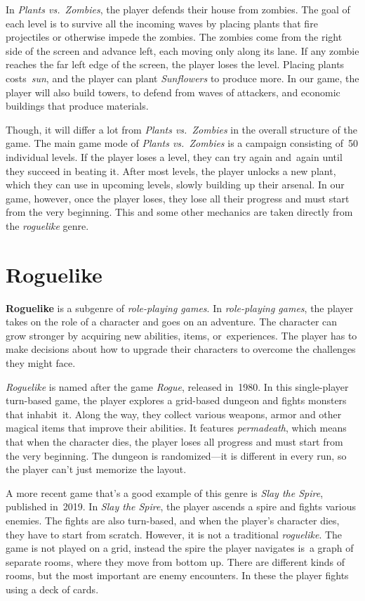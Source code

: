In \emph{Plants vs.\ Zombies}, the player defends their house from zombies.
The goal of each level is to survive all the incoming waves by placing plants that fire projectiles or otherwise impede the zombies.
The zombies come from the right side of the screen and advance left, each moving only along its lane.
If any zombie reaches the far left edge of the screen, the player loses the level.
Placing plants costs~\emph{sun}, and the player can plant \emph{Sunflowers} to produce more.
In our game, the player will also build towers, to defend from waves of attackers, and economic buildings that produce materials.

Though, it will differ a lot from \emph{Plants vs.\ Zombies} in the overall structure of the game.
The main game mode of \emph{Plants vs.\ Zombies} is a campaign consisting of~50 individual levels.
If the player loses a level, they can try again and~again until they succeed in beating it.
After most levels, the player unlocks a new plant, which they can use in upcoming levels, slowly building up their arsenal.
In our game, however, once the player loses, they lose all their progress and must start from the very beginning.
This and some other mechanics are taken directly from the \emph{roguelike} genre.

\section{Roguelike}

\textbf{Roguelike} is a subgenre of \emph{role-playing games}.
In \emph{role-playing games}, the player takes on the role of a character and goes on an adventure.
The character can grow stronger by acquiring new abilities, items, or~experiences.
The player has to make decisions about how to upgrade their characters to overcome the challenges they might face.

\emph{Roguelike} is named after the game \emph{Rogue}\cite{RogueWiki}, released in~1980.
In this single-player turn-based game, the player explores a grid-based dungeon and fights monsters that inhabit~it.
Along the way, they collect various weapons, armor and other magical items that improve their abilities.
It features \emph{permadeath}, which means that when the character dies, the player loses all progress and must start from the very beginning.
The dungeon is randomized---it is different in every run, so the player can't just memorize the layout.

A more recent game that's a good example of this genre is \emph{Slay the Spire}\cite{StSWiki}, published in~2019.
In \emph{Slay the Spire}, the player ascends a spire and fights various enemies.
The fights are also turn-based, and when the player's character dies, they have to start from scratch.
However, it is not a traditional \emph{roguelike}.
The game is not played on a grid, instead the spire the player navigates is~a graph of separate rooms, where they move from bottom up.
There are different kinds of rooms, but the most important are enemy encounters.
In these the player fights using a deck of cards.


